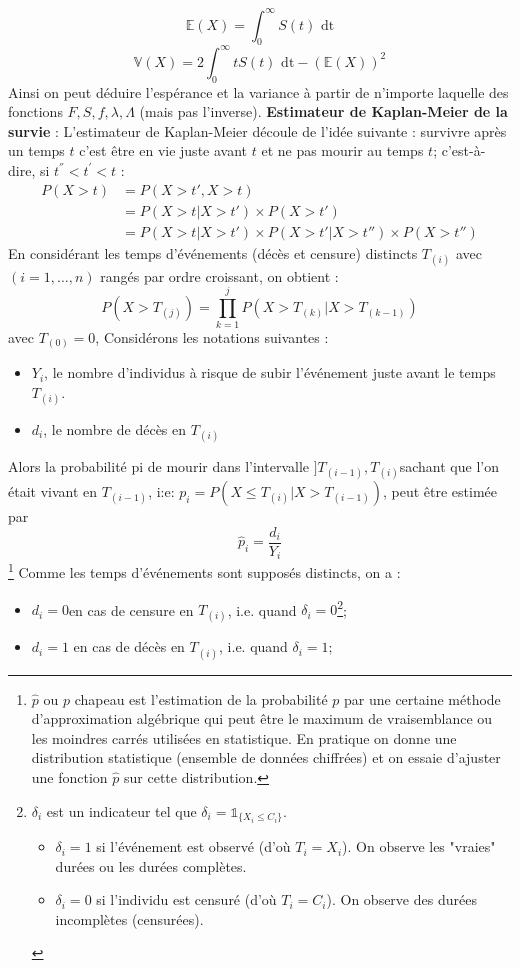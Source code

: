 $$\mathbb{E}(X) = \int_{0}^{\infty} S(t)\textrm{ dt}$$
$$\mathbb{V}(X) = 2\int_{0}^{\infty} tS(t)\textrm{ dt} - (\mathbb{E}(X))^{2}$$
Ainsi on peut déduire l'espérance et la variance à partir de n'importe laquelle des fonctions $F, S, f, \lambda, \Lambda$ (mais pas l'inverse).\newline
\textbf{Estimateur de Kaplan-Meier de la survie} : L'estimateur de Kaplan-Meier découle de l'idée suivante : survivre après un temps $t$ c'est
être en vie juste avant $t$ et ne pas mourir au temps $t$; c'est-à-dire, si $t^{''} < t^{'} < t$ : 
$$\begin{aligned}
P(X > t) &= P(X>t', X > t) \\
        &= P(X > t | X > t')\times P(X > t') \\
        &= P(X > t | X > t') \times P(X > t' | X > t'') \times P(X > t'')
\end{aligned}$$
En considérant les temps d'événements (décès et censure) distincts $T_{(i)}$ avec  $(i = 1,  \dots , n)$ rangés par ordre croissant, on obtient :
$$P(X > T_{(j)}) = \prod_{k=1}^{j} P(X>T_{(k)} | X>T_{(k-1)})$$
avec $T_{(0)} = 0$, Considérons les notations suivantes :
\begin{itemize}
\item $Y_{i}$, le nombre d'individus à risque de subir l'événement juste avant le temps $T_{(i)}$.
\item $d_{i}$, le nombre de décès en $T_{(i)}$
\end{itemize}
Alors la probabilité pi de mourir dans l'intervalle $]T_{(i-1)},T_{(i)}$sachant que l'on était vivant en $T_{(i-1)}$, i:e: $p_{i} = P(X \leq T_{(i)}| X > T_{(i-1)})$, peut être estimée par
$$\widehat{p}_{i} = \frac{d_{i}}{Y_{i}}$$\footnote{$\widehat{p}$ ou $p$ chapeau est l'estimation de la probabilité $p$ par une certaine méthode d'approximation algébrique qui peut être le maximum de vraisemblance ou les moindres carrés utilisées en statistique. En pratique on donne une distribution statistique (ensemble de données chiffrées) et on essaie d'ajuster une fonction $\widehat{p}$ sur cette distribution.}
Comme les temps d'événements sont supposés distincts, on a :
\begin{itemize}
\item $d_{i} = 0 $en cas de censure en $T_{(i)}$, i.e. quand $\delta_{i} = 0$\footnote{$\delta_{i}$ est un indicateur tel que $\delta_{i} = \mathbb{1}_{\{X_{i}\leq C_{i}\}}$.\begin{itemize}\item $\delta_{i}=1$ si l'événement est observé (d'où $T_{i} = X_{i}$). On observe les "vraies" durées ou les durées complètes.\item $\delta_{i}=0$ si l'individu est censuré (d'où $T_{i} = C_{i}$). On observe des durées incomplètes (censurées).\end{itemize}};
\item $d_{i} = 1 $ en cas de décès en $T_{(i)}$, i.e. quand $\delta_{i} = 1$;
\end{itemize}

